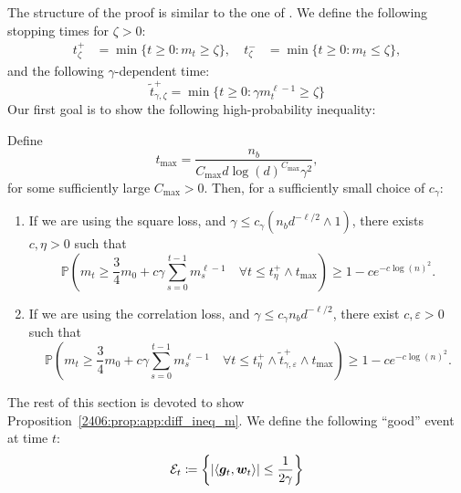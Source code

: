  The structure of the proof is similar to the one of \cite{arous2021online}. We define the following stopping times for $\zeta > 0$:
\begin{align}
    t^+_{\zeta} &= \min\{t \geq 0: m_t \geq \zeta\}, & \ t^-_{\zeta} &= \min\{t \geq 0: m_t \leq \zeta \},
\end{align}
and the following $\gamma$-dependent time:
\begin{equation}
    \tilde t_{\gamma, \zeta}^+ = \min\{t \geq 0: \gamma m_t^{\ell-1} \geq \zeta\}
\end{equation}
 Our first goal is to show the following high-probability inequality:
\begin{proposition}\label{2406:prop:app:diff_ineq_m}
Define
\begin{equation}
    t_{\max} = \frac{n_b}{C_{\max} d \log(d)^{C_{\max}}  \gamma^2},
\end{equation}
for some sufficiently large $C_{\max} > 0$. Then, for a sufficiently small choice of $c_\gamma$:
\begin{enumerate}
    \item If we are using the square loss, and $\gamma \leq c_\gamma (n_b d^{-\ell/2} \wedge 1)$, there exists $c, \eta > 0$ such that
    \begin{equation}
        \mathbb{P}\left( m_t \geq \frac{3}{4} m_0 + c \gamma \sum_{s = 0}^{t-1} m_s^{\ell-1} \quad \forall t \leq t^+_\eta \wedge t_{\max} \right) \geq 1 - c e^{-c\log(n)^2}.
\end{equation}
    \item If we are using the correlation loss, and $\gamma \leq c_\gamma n_b d^{-\ell/2}$, there exist $c, \varepsilon > 0$ such that
    \begin{equation}
            \mathbb{P}\left( m_t \geq \frac{3}{4} m_0 + c \gamma \sum_{s = 0}^{t-1} m_s^{\ell-1} \quad \forall t \leq t^+_\eta \wedge \tilde t_{\gamma, \varepsilon}^+ \wedge t_{\max} \right) \geq 1 - c e^{-c\log(n)^2}.
    \end{equation}
\end{enumerate}
\end{proposition}

The rest of this section is devoted to show Proposition~\ref{2406:prop:app:diff_ineq_m}. We define the following ``good'' event at time $t$:
\[ \mathcal{E}_t \coloneqq \left\{ |\langle {\boldsymbol{g}}_t, {\boldsymbol{w}}_t \rangle | \leq \frac1{2\gamma} \right\} \]

